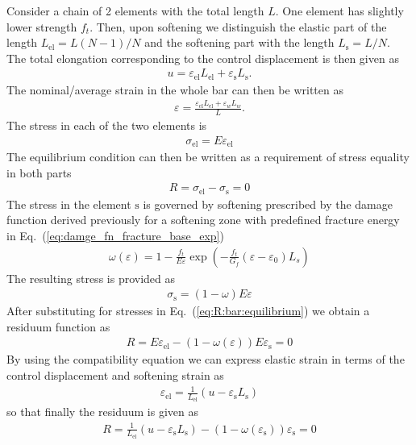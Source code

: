 \documentclass[main.tex]{subfiles}
\begin{document}
Consider a chain of 2 elements with the total length $L$. One element has slightly lower strength $f_t$. Then, upon softening we distinguish the elastic part of the length $L_\mathrm{el} = L (N-1)/N$  and the softening part with the length $L_\mathrm{s} =L/N$. The total elongation corresponding to the control displacement is then given as
\begin{align}
u = \varepsilon_\mathrm{el} L_\mathrm{el} + \varepsilon_\mathrm{s} L_\mathrm{s}.
\end{align}
The nominal/average strain in the whole bar can then be written as
\begin{align}
\varepsilon = \frac{\varepsilon_\mathrm{el} L_\mathrm{el} + \varepsilon_w L_w}{L}.
\end{align}
The stress in each of the two elements is
\begin{align}
\sigma_\mathrm{el} = E \varepsilon_\mathrm{el}
\end{align}
The equilibrium condition can then be written as a requirement of stress equality in both parts
\begin{align}
\label{eq:R:bar:equilibrium}
R = \sigma_\mathrm{el} - \sigma_\mathrm{s} = 0
\end{align}
The stress in the element $\mathrm{s}$ is governed by softening prescribed by the damage function
derived previously for a softening zone with predefined fracture energy in Eq.~(\ref{eq:damge_fn_fracture_base_exp})
\begin{align}
\omega(\varepsilon) =  
1 - \frac{f_t}{E \varepsilon} \exp(-\frac{f_t}{G_f} (\varepsilon - \varepsilon_0) L_s )
\end{align}
The resulting stress is provided as
\begin{align}
\sigma_\mathrm{s} = (1 - \omega) E \varepsilon
\end{align}
After substituting for stresses in Eq.~(\ref{eq:R:bar:equilibrium}) we obtain a residuum function as
\begin{align}
R = E \varepsilon_\mathrm{el} 
- 
( 1 - \omega(\varepsilon)) E \varepsilon_\mathrm{s} = 0
\end{align}
By using the compatibility equation we can express elastic strain in terms of the control displacement and softening strain as
\begin{align}
\varepsilon_\mathrm{el} =
\frac{1}{ L_\mathrm{el} }
\left( 
u - \varepsilon_\mathrm{s} L_\mathrm{s}
\right)
\end{align}
so that finally the residuum is given as
\begin{align}
R = \frac{1}{ L_\mathrm{el} }
\left(
u - \varepsilon_\mathrm{s} L_\mathrm{s}
\right)
 - (1 - \omega(\varepsilon_\mathrm{s}))  \varepsilon_\mathrm{s} = 0
\end{align}
\end{document}
